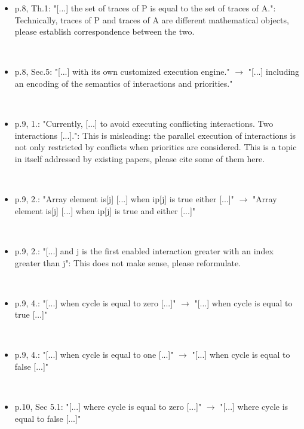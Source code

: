 \begin{itemize}
\item p.8, Th.1: "[...] the set of traces of P is equal to the set of traces of 
A.": Technically, traces of P and traces of A are different mathematical 
objects, please establish correspondence between the two.

~

\done
{}

\item p.8, Sec.5: "[...] with its own customized execution engine." $\rightarrow$ "[...] 
including an encoding of the semantics of interactions and priorities."

~

\done 

\item p.9, 1.: "Currently, [...] to avoid executing conflicting interactions. Two 
interactions [...].": This is misleading: the parallel execution of 
interactions is not only restricted by conflicts when priorities are 
considered. This is a topic in itself addressed by existing papers, please 
cite some of them here.

~

\done

\item p.9, 2.: "Array element is[j] [...] when ip[j] is true either [...]" $\rightarrow$ 
"Array element is[j] [...] when ip[j] is true and either [...]"

~

\done

\item p.9, 2.: "[...] and j is the first enabled interaction greater with an 
index greater than j": This does not make sense, please reformulate.

~

\done

\item p.9, 4.: "[...] when cycle is equal to zero [...]" $\rightarrow$ "[...] when cycle is 
equal to true [...]"

~

\done

\item p.9, 4.: "[...] when cycle is equal to one [...]" $\rightarrow$ "[...] when cycle is 
equal to false [...]"

~

\done

\item p.10, Sec 5.1: "[...] where cycle is equal to zero [...]" $\rightarrow$ "[...] where 
cycle is equal to false [...]"


\end{itemize}
